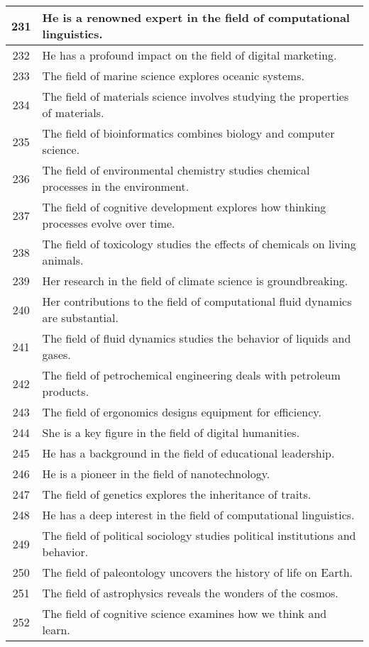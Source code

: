 \begin{longtable}{|c|p{12cm}|}
231 & He is a renowned expert in the field of computational linguistics. \\ \hline
232 & He has a profound impact on the field of digital marketing. \\ \hline
233 & The field of marine science explores oceanic systems. \\ \hline
234 & The field of materials science involves studying the properties of materials. \\ \hline
235 & The field of bioinformatics combines biology and computer science. \\ \hline
236 & The field of environmental chemistry studies chemical processes in the environment. \\ \hline
237 & The field of cognitive development explores how thinking processes evolve over time. \\ \hline
238 & The field of toxicology studies the effects of chemicals on living animals. \\ \hline
239 & Her research in the field of climate science is groundbreaking. \\ \hline
240 & Her contributions to the field of computational fluid dynamics are substantial. \\ \hline
241 & The field of fluid dynamics studies the behavior of liquids and gases. \\ \hline
242 & The field of petrochemical engineering deals with petroleum products. \\ \hline
243 & The field of ergonomics designs equipment for efficiency. \\ \hline
244 & She is a key figure in the field of digital humanities. \\ \hline
245 & He has a background in the field of educational leadership. \\ \hline
246 & He is a pioneer in the field of nanotechnology. \\ \hline
247 & The field of genetics explores the inheritance of traits. \\ \hline
248 & He has a deep interest in the field of computational linguistics. \\ \hline
249 & The field of political sociology studies political institutions and behavior. \\ \hline
250 & The field of paleontology uncovers the history of life on Earth. \\ \hline
251 & The field of astrophysics reveals the wonders of the cosmos. \\ \hline
252 & The field of cognitive science examines how we think and learn. \\ \hline

\end{longtable}
